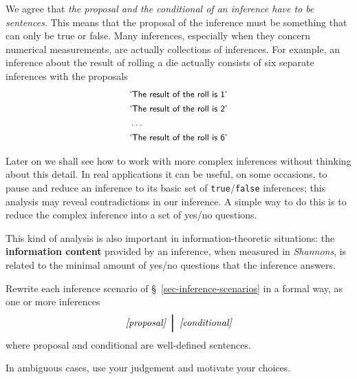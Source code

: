 \documentclass[
  a4paper,
  DIV=11,
  numbers=noendperiod,
  oneside]{scrreprt}
\begin{document}
\hfill\break

We agree that {\emph{the proposal and the conditional of an inference
have to be sentences}}. This means that the proposal of the inference
must be something that can only be true or false. Many inferences,
especially when they concern numerical measurements, are actually
collections of inferences. For example, an inference about the result of
rolling a die actually consists of six separate inferences with the
proposals \[
\begin{aligned}
&\textsf{\small`The result of the roll is 1'}
\\
&\textsf{\small`The result of the roll is 2'}
\\
&\dotso
\\
&\textsf{\small`The result of the roll is 6'}
\end{aligned}
\]

Later on we shall see how to work with more complex inferences without
thinking about this detail. In real applications it can be useful, on
some occasions, to pause and reduce an inference to its basic set of
\texttt{true}/\texttt{false} inferences; this analysis may reveal
contradictions in our inference. A simple way to do this is to reduce
the complex inference into a set of yes/no questions.

This kind of analysis is also important in information-theoretic
situations: the {\textbf{information content}} provided by an inference,
when measured in \emph{Shannons}, is related to the minimal amount of
yes/no questions that the inference answers.

\begin{tcolorbox}[enhanced jigsaw, colback=white, titlerule=0mm, toptitle=1mm, breakable, colbacktitle=quarto-callout-caution-color!10!white, opacitybacktitle=0.6, colframe=quarto-callout-caution-color-frame, opacityback=0, arc=.35mm, leftrule=.75mm, title={\faIcon{user-edit} Exercise}, left=2mm, bottomtitle=1mm, rightrule=.15mm, bottomrule=.15mm, toprule=.15mm, coltitle=black]

Rewrite each inference scenario of §~\ref{sec-inference-scenarios} in a
formal way, as one or more inferences \[
\textit{[proposal]}\ \pmb{\nonscript\:\Big\vert\nonscript\:\mathopen{}}\ \textit{[conditional]}
\] where proposal and conditional are well-defined sentences.

In ambiguous cases, use your judgement and motivate your choices.

\end{tcolorbox}
\end{document}
